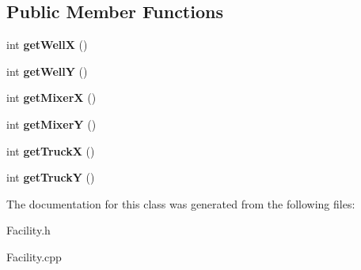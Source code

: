 \subsection*{Public Member Functions}
\begin{DoxyCompactItemize}
\item 
\mbox{\label{classFacility_a7c78504d3a00acecd711a8b1660bdd75}} 
int {\bfseries get\+WellX} ()
\item 
\mbox{\label{classFacility_a2a05eb6d177de7c03ed1a49dc3dd0a23}} 
int {\bfseries get\+WellY} ()
\item 
\mbox{\label{classFacility_a9da908938a996df43fa0933469a4a60f}} 
int {\bfseries get\+MixerX} ()
\item 
\mbox{\label{classFacility_a83974275a93f061cc7b5c080de5f2c8e}} 
int {\bfseries get\+MixerY} ()
\item 
\mbox{\label{classFacility_a800ac7290dbba8f15c8b0d9446073de0}} 
int {\bfseries get\+TruckX} ()
\item 
\mbox{\label{classFacility_aed8bda7a1dfc76391903bcf92b35ab13}} 
int {\bfseries get\+TruckY} ()
\end{DoxyCompactItemize}


The documentation for this class was generated from the following files\+:\begin{DoxyCompactItemize}
\item 
Facility.\+h\item 
Facility.\+cpp\end{DoxyCompactItemize}
